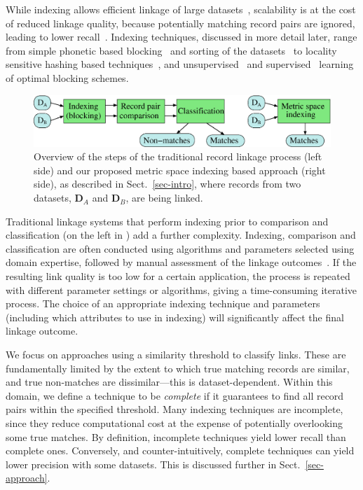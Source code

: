\documentclass{llncs}
\begin{document}
While indexing allows efficient linkage of large datasets~\cite{Don15},
scalability is at the cost of reduced linkage quality, because
potentially matching record pairs are ignored, leading to lower
recall~\cite{Chr12}. Indexing techniques, discussed in more detail
later, range from simple phonetic based blocking~\cite{Chr12} and
sorting of the datasets~\cite{Dra12} to locality sensitive hashing based
techniques~\cite{Kim10,Steorts2014}, and unsupervised~\cite{Kej13,Ram15}
and supervised~\cite{Bil06,Mic06} learning of optimal blocking schemes.



\begin{figure}[!t]
  \centering
  \includegraphics[width=1.0\textwidth]{figures/linkage-process}
  \caption{Overview of the steps of the traditional record linkage
           process (left side) and our proposed metric space
           indexing based approach (right side), as described in
           Sect.~\ref{sec-intro}, where records from two datasets,
           $\mathbf{D}_A$ and $\mathbf{D}_B$, are being linked.}
           \label{fig-rl-process}
\end{figure}


Traditional linkage systems that perform indexing prior to comparison
and classification (on the left in ) add a further
complexity. Indexing, comparison and classification are often conducted
using algorithms and parameters selected using domain expertise,
followed by manual assessment of the linkage outcomes~\cite{Chr12}. If
the resulting link quality is too low for a certain application, the
process is repeated with different parameter settings or algorithms,
giving a time-consuming iterative process. The choice of an appropriate
indexing technique and parameters (including which attributes to use in
indexing) will significantly affect the final linkage outcome.

We focus on approaches using a similarity threshold to classify links.
These are fundamentally limited by the extent to which true matching
records are similar, and true non-matches are dissimilar---this is
dataset-dependent. Within this domain, we define a technique to be
\emph{complete} if it guarantees to find all record pairs within the
specified threshold. Many indexing techniques are incomplete, since they
reduce computational cost at the expense of potentially overlooking some
true matches. By definition, incomplete techniques yield lower recall
than complete ones. Conversely, and counter-intuitively, complete
techniques can yield lower precision with some datasets. This is
discussed further in Sect.~\ref{sec-approach}.
\end{document}
